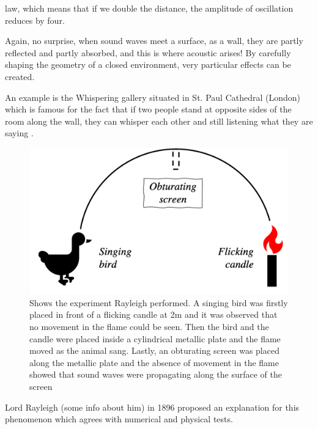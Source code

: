 \documentclass[draft ]{article}
\begin{document}
law, which means that if we double the distance, the amplitude of oscillation reduces by four.

Again, no surprise, when sound waves meet a surface, as a wall, they are partly reflected and partly absorbed, and this is where acoustic arises! By carefully shaping the geometry of a closed environment, very particular effects can be created.

An example is the Whispering gallery situated in St. Paul Cathedral (London) which is famous for the fact that if two people stand at opposite sides of the room along the wall, they can whisper each other and still listening what they are saying \cite{article:whispering}.

\begin{figure}[ht!]
\centering
\begin{tcolorbox}

\includegraphics[scale=0.3]{rayleigh_experiment}
\caption{ Shows the experiment Rayleigh performed. A singing bird was firstly placed in front of a flicking candle at 2m and it was observed that no movement in the flame could be seen. Then the bird and the candle were placed inside a cylindrical metallic plate and the flame moved as the animal sang. Lastly, an obturating screen was placed along the metallic plate and the absence of movement in the flame showed that sound waves were propagating along the surface of the screen }
\label{fig:duck}

\end{tcolorbox}\par\bigskip
\end{figure}

Lord Rayleigh (some info about him) in 1896 proposed an explanation for this phenomenon which agrees with numerical and physical tests.
\end{document}
